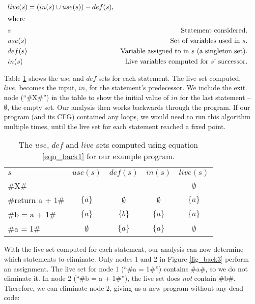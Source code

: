 \documentclass[12pt]{report}
\begin{document}
\begin{align}
  & live(s) = (in(s) \cup use(s)) - def(s), \label{eqn_back1} \\
\intertext{where}
  & s     & \text{Statement considered.} \notag\\
  & use(s) &  \text{Set of variables used in $s$}. \notag\\
  & def(s) & \text{Variable assigned to in $s$ (a singleton set)}. \notag\\
  & in(s) & \text{Live variables computed for $s$' successor}. \notag
\end{align}

Table \ref{tbl_back1} shows the $use$ and $def$ sets for each
statement. The live set computed, $live$, becomes the input, $in$, for
the statement's predecessor. We include the exit node (``#X#'') in the
table to show the initial value of $in$ for the last statement --
$\emptyset$, the empty set. Our analysis then works backwards through the
program. If our program (and its CFG) contained any loops, we would
need to run this algorithm multiple times, until the live set for each
statement reached a fixed point.

\begin{table}
  \centering
  \begin{tabular}{lcccc}
    $s$ & $use(s)$ & $def(s)$ & $in(s)$ &  $live(s)$ \\
    \cmidrule(r){1-1}\cmidrule(r){2-2}\cmidrule(r){3-3}\cmidrule(r){4-4}\cmidrule(r){5-5}
    #X# & & & & $\emptyset$ \\
    #return a + 1# & $\{a\}$ & $\emptyset$ & $\emptyset$ & $\{a\}$ \\
    #b = a + 1# & $\{a\}$ & $\{b\}$ & $\{a\}$ & $\{a\}$ \\
    #a = 1# & $\emptyset$ & $\{a\}$ & $\{a\}$ & $\emptyset$ \\
    \bottomrule
  \end{tabular}
  \caption{The $use$, $def$ and $live$ sets computed using equation \ref{eqn_back1} for our example program.}
  \label{tbl_back1}
\end{table}

With the live set computed for each statement, our analysis can now
determine which statements to eliminate. Only nodes 1 and 2 in Figure
\ref{fig_back3} perform an assignment. The live set for node 1 (``#a = 1#'')
contains #a#, so we do not eliminate it. In node 2 (``#b = a + 1#''),
the live set does \emph{not} contain #b#. Therefore, we can eliminate
node 2, giving us a new program without any dead code:
\end{document}
